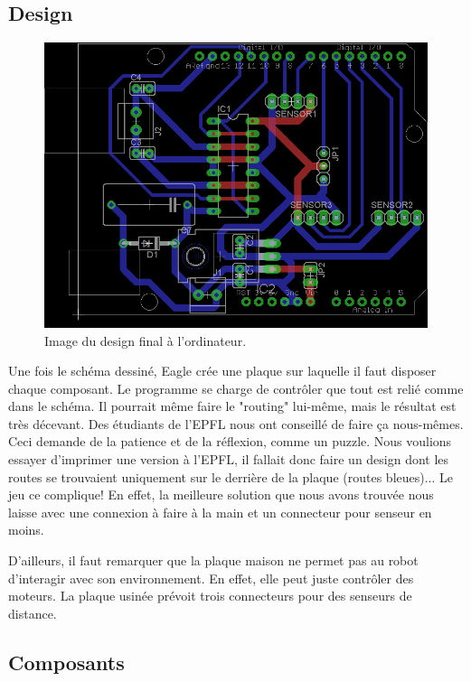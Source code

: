 \documentclass[a4paper,11pt]{report}
\begin{document}
{\subsection{Design}
\begin{figure}[h]
\centering
\includegraphics[width=1\textwidth]{figures/board_CHI.png}
\caption[Design final du PCB]{\label{BoardChine}Image du design final à l'ordinateur.
}
\end{figure}

Une fois le schéma dessiné, Eagle crée une plaque sur laquelle il faut disposer chaque composant. Le programme se charge de contrôler que tout est relié comme dans le schéma. Il pourrait même faire le "routing" lui-même, mais le résultat est très décevant. Des étudiants de l'EPFL nous ont conseillé de faire ça nous-mêmes. Ceci demande de la patience et de la réflexion, comme un puzzle. Nous voulions essayer d'imprimer une version à l'EPFL, il fallait donc faire un design dont les routes se trouvaient uniquement sur le derrière de la plaque (routes bleues)... Le jeu ce complique! En effet, la meilleure solution que nous avons trouvée nous laisse avec une connexion à faire à la main et un connecteur pour senseur en moins.

D'ailleurs, il faut remarquer que la plaque maison ne permet pas au robot d'interagir avec son environnement. En effet, elle peut juste contrôler des moteurs. La plaque usinée prévoit trois connecteurs pour des senseurs de distance.


\subsection{Composants}

}
\end{document}
